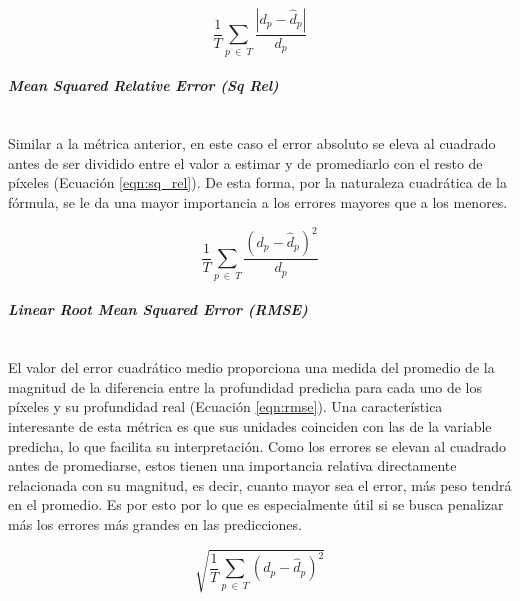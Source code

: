 \begin{equation}
\label{eqn:abs_rel}
\frac{1}{T}\sum_{p\ \in\ T} \frac{|d_p - \hat{d}_p|}{d_p}
\end{equation}

\paragraph{\textit{Mean Squared Relative Error (Sq Rel)}}\mbox{}\\
Similar a la métrica anterior, en este caso el error absoluto se eleva al cuadrado antes de ser dividido entre el valor a estimar y de promediarlo con el resto de píxeles (Ecuación \ref{eqn:sq_rel}). De esta forma, por la naturaleza cuadrática de la fórmula, se le da una mayor importancia a los errores mayores que a los menores.

\begin{equation}
\label{eqn:sq_rel}
\frac{1}{T}\sum_{p\ \in\ T} \frac{(d_p - \hat{d}_p)^2}{d_p}
\end{equation}

\paragraph{\textit{Linear Root Mean Squared Error (RMSE)}}\mbox{}\\
El valor del error cuadrático medio proporciona una medida del promedio de la magnitud de la diferencia entre la profundidad predicha para cada uno de los píxeles y su profundidad real (Ecuación \ref{eqn:rmse}). Una característica interesante de esta métrica es que sus unidades coinciden con las de la variable predicha, lo que facilita su interpretación. Como los errores se elevan al cuadrado antes de promediarse, estos tienen una importancia relativa directamente relacionada con su magnitud, es decir, cuanto mayor sea el error, más peso tendrá en el promedio. Es por esto por lo que es especialmente útil si se busca penalizar más los errores más grandes en las predicciones.

\begin{equation}
\label{eqn:rmse}
\sqrt{\frac{1}{T}\sum_{p\ \in\ T} (d_p - \hat{d}_p)^2}
\end{equation}

